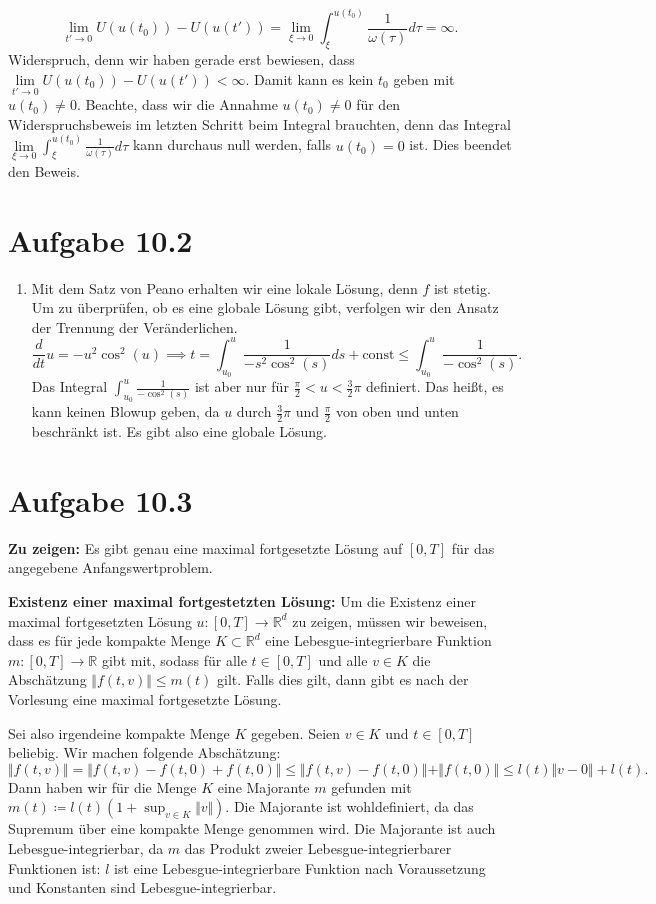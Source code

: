 \documentclass[a4paper]{article}
\theoremstyle{plain}
\begin{document}
\[
	\lim_{t' \to 0} U(u(t_0)) - U(u(t')) = \lim_{\xi \to 0}\int^{u(t_0)}_{\xi} \frac{1}{\omega(\tau)}d\tau = \infty.
\]
Widerspruch, denn wir haben gerade erst bewiesen, dass $\lim\limits_{t' \to 0}U(u(t_0)) - U(u(t')) < \infty$. Damit kann es kein $t_0$ geben mit $u(t_0) \neq 0$. Beachte, dass wir die Annahme $u(t_0) \neq 0$ für den Widerspruchsbeweis im letzten Schritt beim Integral brauchten, denn das Integral
$
	 \lim\limits_{\xi \to 0}\int^{u(t_0)}_{\xi} \frac{1}{\omega(\tau)}d\tau
$
kann durchaus null werden, falls $u(t_0) = 0$ ist. Dies beendet den Beweis.
		
\section*{Aufgabe 10.2}
\begin{enumerate}[label=(\roman*)]
	\item Mit dem Satz von Peano erhalten wir eine lokale Lösung, denn $f$ ist stetig. Um zu überprüfen, ob es eine globale Lösung gibt, verfolgen wir den Ansatz der Trennung der Veränderlichen.
	\[
		\frac{d}{dt}u = -u^2 \cos^2(u) \implies t  = \int^u_{u_0} \frac{1}{-s^2 \cos^2(s)}ds + \mathrm{const} \leq \int^{u}_{u_0} \frac{1}{-\cos^2(s)}.
	\]
	Das Integral $\int^{u}_{u_0} \frac{1}{-\cos^2(s)}$ ist aber nur für $\frac{\pi}{2} < u < \frac{3}{2}\pi$ definiert. Das heißt, es kann keinen Blowup geben, da $u$ durch $\frac{3}{2}\pi$ und $\frac{\pi}{2}$ von oben und unten beschränkt ist. Es gibt also eine globale Lösung.
\end{enumerate}	

\section*{Aufgabe 10.3}
\textbf{Zu zeigen:} Es gibt genau eine maximal fortgesetzte Lösung auf $[0,T]$ für das angegebene Anfangswertproblem.

\textbf{Existenz einer maximal fortgestetzten Lösung:} Um die Existenz einer maximal fortgesetzten Lösung $u: [0,T] \to \mathbb R^d$ zu zeigen, müssen wir beweisen, dass es für jede kompakte Menge $K \subset \mathbb R^d$ eine Lebesgue-integrierbare Funktion $m: [0,T] \to \mathbb R$ gibt mit, sodass für alle $t \in [0,T]$ und alle $v \in K$ die Abschätzung $\Vert f(t,v) \Vert \leq m(t)$ gilt. Falls dies gilt, dann gibt es nach der Vorlesung eine maximal fortgesetzte Lösung.

Sei also irgendeine kompakte Menge $K$ gegeben. Seien $v \in K$ und $t \in [0,T]$ beliebig. Wir machen folgende Abschätzung:
 $$\Vert f(t,v) \Vert = \Vert f(t,v) - f(t,0) + f(t,0)\Vert \leq  \Vert f(t,v) - f(t,0) \Vert + \Vert f(t,0)\Vert \leq l(t)\Vert v-0 \Vert + l (t).$$
 Dann haben wir für die Menge $K$ eine Majorante $m$ gefunden mit $m(t) \coloneqq l(t)(1+ \sup_{v \in K}\Vert v \Vert)$. Die Majorante ist wohldefiniert, da das Supremum über eine kompakte Menge genommen wird. Die Majorante ist auch Lebesgue-integrierbar, da $m$ das Produkt zweier Lebesgue-integrierbarer Funktionen ist: $l$ ist eine Lebesgue-integrierbare Funktion nach Voraussetzung und Konstanten sind Lebesgue-integrierbar. 
\end{document}
